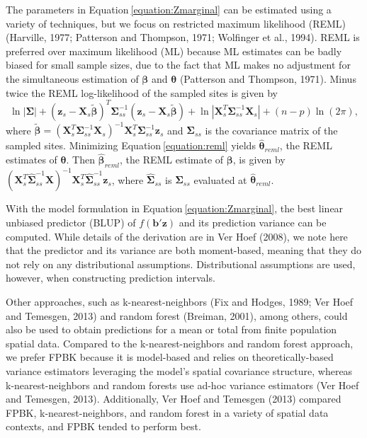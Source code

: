\documentclass[]{elsarticle} %
\begin{document}
The parameters in Equation\(~\)\ref{equation:Zmarginal} can be estimated
using a variety of techniques, but we focus on restricted maximum
likelihood (REML) (Harville, 1977; Patterson and Thompson, 1971;
Wolfinger et al., 1994). REML is preferred over maximum likelihood (ML)
because ML estimates can be badly biased for small sample sizes, due to
the fact that ML makes no adjustment for the simultaneous estimation of
\(\bm{\beta}\) and \(\bm{\theta}\) (Patterson and Thompson, 1971). Minus
twice the REML log-likelihood of the sampled sites is given by
\begin{equation}\label{equation:reml}
  \ln|\bm{\Sigma}| + (\bm{z}_s - \bm{X}_s \bm{\tilde{\beta}})^T \bm{\Sigma}_{ss}^{-1}(\bm{z}_s - \bm{X}_s \bm{\tilde{\beta}}) + \ln|\bm{X}_s^T \bm{\Sigma}_{ss}^{-1} \bm{X}_s| + (n - p) \ln(2 \pi) ,
\end{equation} where
\(\bm{\tilde{\beta}} = (\bm{X}_s^T \bm{\Sigma}_{ss}^{-1} \bm{X}_s)^{-1} \bm{X}_s^T \bm{\Sigma}_{ss}^{-1} \bm{z}_s\)
and \(\bm{\Sigma}_{ss}\) is the covariance matrix of the sampled sites.
Minimizing Equation\(~\)\ref{equation:reml} yields
\(\bm{\hat{\theta}}_{reml}\), the REML estimates of \(\bm{\theta}\).
Then \(\bm{\hat{\beta}}_{reml}\), the REML estimate of \(\bm{\beta}\),
is given by
\((\bm{X}_s^T \bm{\hat{\Sigma}}_{ss}^{-1} \bm{X})^{-1} \bm{X}_s^T \bm{\hat{\Sigma}}_{ss}^{-1} \bm{z}_s\),
where \(\bm{\hat{\Sigma}}_{ss}\) is \(\bm{\Sigma}_{ss}\) evaluated at
\(\bm{\hat{\theta}}_{reml}\).

With the model formulation in Equation\(~\)\ref{equation:Zmarginal}, the
best linear unbiased predictor (BLUP) of \(f(\mathbf{b}'\mathbf{z})\)
and its prediction variance can be computed. While details of the
derivation are in Ver Hoef (2008), we note here that the predictor and
its variance are both moment-based, meaning that they do not rely on any
distributional assumptions. Distributional assumptions are used,
however, when constructing prediction intervals.

Other approaches, such as k-nearest-neighbors (Fix and Hodges, 1989; Ver
Hoef and Temesgen, 2013) and random forest (Breiman, 2001), among
others, could also be used to obtain predictions for a mean or total
from finite population spatial data. Compared to the k-nearest-neighbors
and random forest approach, we prefer FPBK because it is model-based and
relies on theoretically-based variance estimators leveraging the model's
spatial covariance structure, whereas k-nearest-neighbors and random
forests use ad-hoc variance estimators (Ver Hoef and Temesgen, 2013).
Additionally, Ver Hoef and Temesgen (2013) compared FPBK,
k-nearest-neighbors, and random forest in a variety of spatial data
contexts, and FPBK tended to perform best.
\end{document}
